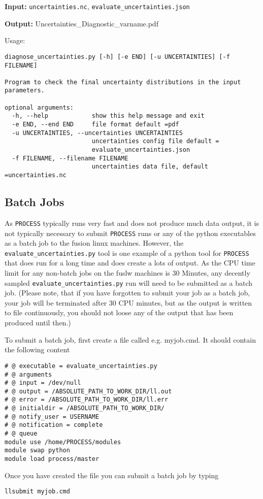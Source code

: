 \documentclass[11pt,a4paper]{article}
\newcommand{\process}{\mbox{\texttt{PROCESS}}}
\begin{document}
\begin{description}
\item{\textbf{Input:}}
 \texttt{uncertainties.nc}, \texttt{evaluate\_uncertainties.json}

\item{\textbf{Output:}}
Uncertainties\_Diagnostic\_varname.pdf
\end{description}

Usage:
\begin{verbatim}
diagnose_uncertainties.py [-h] [-e END] [-u UNCERTAINTIES] [-f FILENAME]

Program to check the final uncertainty distributions in the input parameters.

optional arguments:
  -h, --help            show this help message and exit
  -e END, --end END     file format default =pdf
  -u UNCERTAINTIES, --uncertainties UNCERTAINTIES
                        uncertainties config file default =
                        evaluate_uncertainties.json
  -f FILENAME, --filename FILENAME
                        uncertainties data file, default =uncertainties.nc

\end{verbatim}

\subsection{Batch Jobs}
As \process\/ typically runs very fast and does not produce much data output, it is not typically necessary to submit \process\/ runs or any of the python executables as a batch job to the fusion linux machines. However, the \texttt{evaluate\_uncertainties.py} tool is one example of a python tool for \process\/ that does run for a long time and does create a lots of output. As the CPU time limit for any non-batch jobs on the fuslw machines is 30 Minutes, any decently sampled \texttt{evaluate\_uncertainties.py} run will need to be submitted as a batch job. (Please note, that if you have forgotten to submit your job as a batch job, your job will be terminated after 30 CPU minutes, but as the output is written to file continuously, you should not loose any of the output that has been produced until then.)

To submit a batch job, first create a file called e.g. myjob.cmd. It should contain the following content
\begin{verbatim}
# @ executable = evaluate_uncertainties.py
# @ arguments
# @ input = /dev/null
# @ output = /ABSOLUTE_PATH_TO_WORK_DIR/ll.out
# @ error = /ABSOLUTE_PATH_TO_WORK_DIR/ll.err
# @ initialdir = /ABSOLUTE_PATH_TO_WORK_DIR/
# @ notify_user = USERNAME
# @ notification = complete
# @ queue
module use /home/PROCESS/modules
module swap python
module load process/master
\end{verbatim}
Once you have created the file you can submit a batch job by typing
\begin{verbatim}
llsubmit myjob.cmd
\end{verbatim}
\end{document}
